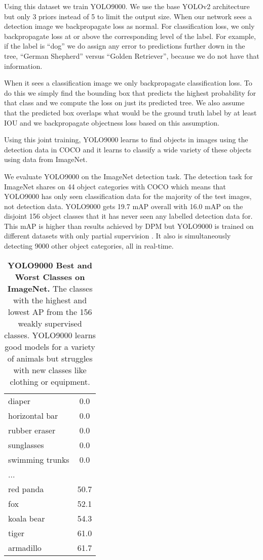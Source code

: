 \documentclass[10pt,twocolumn,letterpaper]{article}
\newcommand{\inet}{19.7}
\newcommand{\inone}{16.0}
\begin{document}
Using this dataset we train YOLO9000. We use the base YOLOv2 architecture but only 3 priors instead of 5 to limit the output size. When our network sees a detection image we backpropagate loss as normal. For classification loss, we only backpropagate loss at or above the corresponding level of the label. For example, if the label is ``dog'' we do assign any error to predictions further down in the tree, ``German Shepherd'' versus ``Golden Retriever'', because we do not have that information.

When it sees a classification image we only backpropagate classification loss. To do this we simply find the bounding box that predicts the highest probability for that class and we compute the loss on just its predicted tree. We also assume that the predicted box overlaps what would be the ground truth label by at least  IOU and we backpropagate objectness loss based on this assumption.

Using this joint training, YOLO9000 learns to find objects in images using the detection data in COCO and it learns to classify a wide variety of these objects using data from ImageNet.

We evaluate YOLO9000 on the ImageNet detection task. The detection task for ImageNet shares on 44 object categories with COCO which means that YOLO9000 has only seen classification data for the majority of the test images, not detection data. YOLO9000 gets \inet{} mAP overall with \inone{} mAP on the disjoint 156 object classes that it has never seen any labelled detection data for. This mAP is higher than results achieved by DPM but YOLO9000 is trained on different datasets with only partial supervision \cite{DPM}. It also is simultaneously detecting 9000 other object categories, all in real-time.

\begin{table}[h]
\begin{center}
\begin{tabular}{lc}
diaper & 0.0\\
horizontal bar & 0.0 \\
rubber eraser & 0.0 \\
sunglasses & 0.0 \\
swimming trunks & 0.0 \\
... \\
red panda & 50.7 \\
fox  & 52.1  \\
koala bear & 54.3   \\
tiger  & 61.0  \\
armadillo & 61.7\\

\end{tabular}
\end{center}
\caption{\small \textbf{YOLO9000 Best and Worst Classes on ImageNet.} The classes with the highest and lowest AP from the 156 weakly supervised classes. YOLO9000 learns good models for a variety of animals but struggles with new classes like clothing or equipment.}
\label{res}
\end{table}
\end{document}

